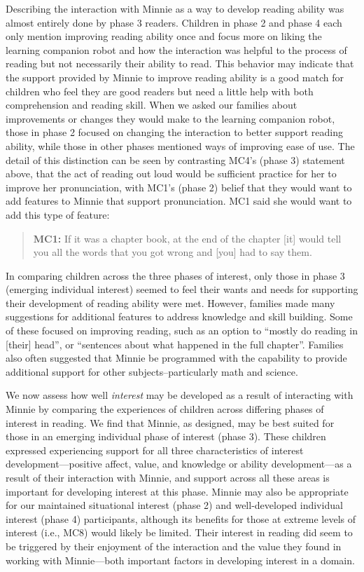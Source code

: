 \documentclass{sigchi}
\begin{document}
Describing the interaction with Minnie as a way to develop reading ability was almost entirely done by phase 3 readers. Children in phase 2 and phase 4 each only mention improving reading ability once and focus more on liking the learning companion robot and how the interaction was helpful to the process of reading but not necessarily their ability to read. This behavior may indicate that the support provided by Minnie to improve reading ability is a good match for children who feel they are good readers but need a little help with both comprehension and reading skill. When we asked our families about improvements or changes they would make to the learning companion robot, those in phase 2 focused on changing the interaction to better support reading ability, while those in other phases mentioned ways of improving ease of use. The detail of this distinction can be seen by contrasting MC4's (phase 3) statement above, that the act of reading out loud would be sufficient practice for her to improve her pronunciation, with MC1's (phase 2) belief that they would want to add features to Minnie that support pronunciation. MC1 said she would want to add this type of feature:
	 \begin{quote}
	 \textbf{MC1:} If it was a chapter book, at the end of the chapter [it] would tell you all the words that you got wrong and [you] had to say them.
	\end{quote}

In comparing children across the three phases of interest, only those in phase 3 (emerging individual interest) seemed to feel their wants and needs for supporting their development of reading ability were met. However, families made many suggestions for additional features to address knowledge and skill building. Some of these focused on improving reading, such as an option to ``mostly do reading in [their] head'', or ``sentences about what happened in the full chapter''. Families also often suggested that Minnie be programmed with the capability to provide additional support for other subjects--particularly math and science.

We now assess how well \textit{interest} may be developed as a result of interacting with Minnie by comparing the experiences of children across differing phases of interest in reading. We find that Minnie, as designed, may be best suited for those in an emerging individual phase of interest (phase 3). These children expressed experiencing support for all three characteristics of interest development---positive affect, value, and knowledge or ability development---as a result of their interaction with Minnie, and support across all these areas is important for developing interest at this phase. Minnie may also be appropriate for our maintained situational interest (phase 2) and well-developed individual interest (phase 4) participants, although its benefits for those at extreme levels of interest (i.e., MC8) would likely be limited. Their interest in reading did seem to be triggered by their enjoyment of the interaction and the value they found in working with Minnie---both important factors in developing interest in a domain.
\end{document}

